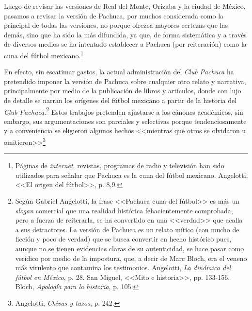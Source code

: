 \documentclass[11pt,a5paper,twoside]{book} %
\begin{document}
\noindent Luego de revisar las versiones de Real del Monte, Orizaba y la ciudad de México, pasamos
a revisar la versión de Pachuca, por muchos considerada como la principal de todas las
versiones, no porque ofrezca mayores certezas que las demás, sino que ha sido la más
difundida, ya que, de forma sistemática y a través de diversos medios se ha intentado
establecer a Pachuca (por reiteración) como la cuna del fútbol mexicano.\footnote{Páginas de \emph{internet}, revistas, programas de radio y televisión han sido utilizados para señalar que Pachuca es
la cuna del fútbol mexicano. Angelotti, <<El origen del fútbol>>, p. 8,9.}

En efecto, sin escatimar gastos, la actual administración del \emph{Club Pachuca} ha
pretendido imponer la versión de Pachuca sobre cualquier otro relato y narrativa,
principalmente por medio de la publicación de libros y artículos, donde con lujo de detalle
se narran los orígenes del fútbol mexicano a partir de la historia del \emph{Club Pachuca}.\footnote{Según Gabriel Angelotti, la frase <<Pachuca cuna del fútbol>> es más un \emph{slogan} comercial que una realidad histórica fehacientemente comprobada, pero a fuerza de reiterarla, se ha convertido en una <<verdad>> que acalla a sus detractores. La versión de Pachuca es un relato mítico (con mucho de ficción y poco de verdad) que se busca convertir en hecho histórico pues, aunque no se tienen evidencias claras de su autenticidad, se hace pasar como verídico por medio de la impostura, que, a decir de Marc Bloch, era el veneno más virulento que contamina los testimonios. Angelotti, \emph{La dinámica del fútbol en México}, p. 28. San Miguel, <<Mito e historia>>, pp. 133-156. Bloch, \emph{Apología para la historia}, p. 105.} Estos
trabajos pretenden ajustarse a los cánones académicos, sin embargo, sus argumentaciones son parciales y selectivas porque tendenciosamente y a conveniencia se eligieron algunos hechos <<mientras que otros se olvidaron u omitieron>>\footnote{Angelotti, \emph{Chivas y tuzos}, p. 242.}
\end{document}
